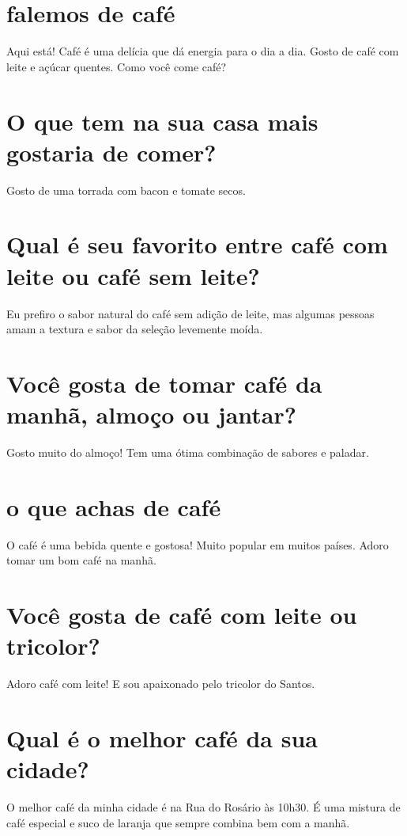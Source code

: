 \documentclass[11pt,a4paper]{article}
\begin{document}
\maketitle
\begin{abstract}Exploração do ollama a partir de sementes banais (nível 1). Teoria continua de fora.\end{abstract}
\section{falemos de café}
Aqui está! Café é uma delícia que dá energia para o dia a dia. Gosto de café com leite e açúcar quentes. Como você come café?

\section{O que tem na sua casa mais gostaria de comer?}
Gosto de uma torrada com bacon e tomate secos.

\section{Qual é seu favorito entre café com leite ou café sem leite?}
Eu prefiro o sabor natural do café sem adição de leite, mas algumas pessoas amam a textura e sabor da seleção levemente moída.

\section{Você gosta de tomar café da manhã, almoço ou jantar?}
Gosto muito do almoço! Tem uma ótima combinação de sabores e paladar.

\section{o que achas de café}
O café é uma bebida quente e gostosa! Muito popular em muitos países. Adoro tomar um bom café na manhã.

\section{Você gosta de café com leite ou tricolor?}
Adoro café com leite! E sou apaixonado pelo tricolor do Santos.

\section{Qual é o melhor café da sua cidade?}
O melhor café da minha cidade é na Rua do Rosário às 10h30. É uma mistura de café especial e suco de laranja que sempre combina bem com a manhã.
\end{document}
